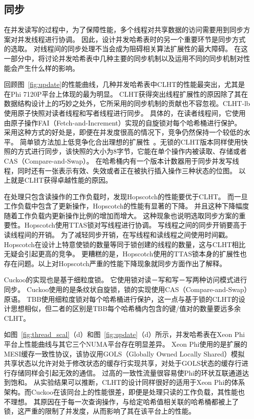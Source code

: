 \subsection{同步}
\label{sec:sync}
在并发读写的过程中，为了保障性能，多个线程对共享数据的访问需要用到同步方案对并发线程进行协调。
因此，设计并发哈希表时的另一个重要环节是同步方式的选取。
对线程间的同步处理不当会成为阻碍相关算法扩展性的最大障碍。
在这一部分中，将讨论并发哈希表中几种主要的同步机制以及运用不同的同步机制对性能会产生什么样的影响。

回顾图~\ref{fig:update}的性能曲线，几种并发哈希表中CLHT的性能最突出，尤其是在Phi 7120P平台上体现的最为明显。
CLHT获得突出线程扩展性的原因除了其在数据结构设计上的巧妙之处外，它所采用的同步机制的贡献也不容忽视。CLHT-lb使用原子快照对读者线程和写者线程进行同步。
具体的，在读者线程间，它使用由原子操作FAI（Fetch-and-Increment）实现的自旋锁对每个哈希桶进行保护。
采用这种方式的好处是，即便在并发度很高的情况下，竞争仍然保持一个较低的水平。
简单锁方法加上低竞争化合出理想的扩展性~\cite{david}。无锁的CLHT版本同样使用快照的方式进行同步，该快照的大小为8字节，它能在单个操作内被读取、存储或者CAS（Compare-and-Swap）。
在哈希桶内有一个版本计数器用于同步并发写线程，同时还有一张表示有效、失效或者正在被执行插入操作三种状态的位图。
以上就是CLHT获得卓越性能的原因。

在处理只包含读操作的工作负载时，发现Hopscotch的性能要优于CLHT。
而一旦工作负载中包含了更新操作，Hopscotch的性能有显著的下降。
并且这种下降幅度随着工作负载内更新操作比例的增加而增大。
这种现象也说明选取同步方案的重要性。Hopscotch使用TTAS锁对写线程进行协调。
写线程之间的同步开销要高于读线程间的开销。
为了减轻同步开销，在写线程和读线程之间使用时间戳。
Hopscotch在设计上特意使锁的数量等同于锁创建的线程的数量，这与CLHT相比无疑会引起更高的竞争。
更糟糕的是，Hopscotch使用的TTAS锁本身的扩展性也存在问题。以上对Hopscotch严重的性能下降现象就同步方面作出了解释。

Cuckoo的实现也是基于细粒度锁。
它使用锁对读－写和写－写两种访问模式进行同步。
Cuckoo使用的是条纹状自旋锁，锁的实现使用CAS（Compare-and-Swap）原语。
TBB使用细粒度锁对每个哈希桶进行保护，这一点与基于锁的CLHT的设计思想相似，但二者的区别是TBB每个哈希桶内包含的键/值对的数量要远多余CLHT。

如图~\ref{fig:thread_scal}（d）和图~\ref{fig:update}（d）所示，并发哈希表在Xeon Phi平台上性能曲线与其它三个NUMA平台存在明显差异。
Xeon Phi使用的是扩展的MESI缓存一致性协议，该协议用GOLS（Globally Owned Locally Shared）模拟共享状态以允许对处于修改状态的缓存行实现共享，对处于GOLS状态的缓存行进行存储同样会引起无效的通信。
过高的一致性流量很容易使Phi的环状互联通道达到饱和。
从实验结果可以推断，CLHT的设计同样很好的适用于Xeon Phi的体系架构。而Cuckoo在该同台上的性能很差，即便是处理只读的工作负载，其性能也不理想。
其原因在于每一次查询操作，与给定哈希值相关联的哈希桶都被上了锁，这严重的限制了并发度，从而影响了其在该平台上的性能。

